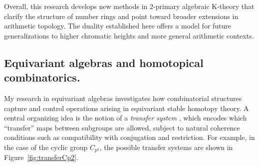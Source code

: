\documentclass[11pt]{article}
\begin{document}
Overall, this research develops new methods in $2$-primary algebraic K-theory that clarify the structure of number rings and point toward broader extensions in arithmetic topology.
The duality established here offers a model for future generalizations to higher chromatic heights and more general arithmetic contexts.

\subsection{Equivariant algebras and homotopical combinatorics.}
My research in equivariant algebras investigates how combinatorial structures capture and control  operations arising in equivariant stable homotopy theory.
A central organizing idea is the notion of a {\it transfer system} \cite{MR4244201}, which encodes which “transfer” maps between subgroups are allowed, subject to natural coherence conditions such as compatibility with conjugation and restriction.
For example, in the case of the cyclic group $C_{p^2}$, the possible transfer systems are shown in Figure~\ref{fig:transferCp2}.
\end{document}
